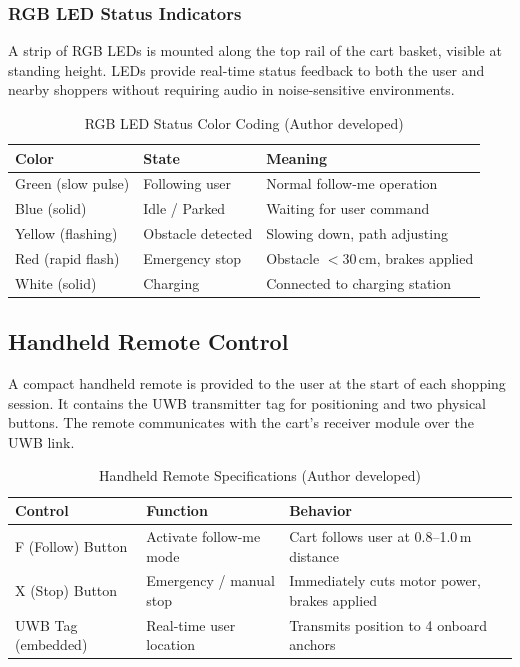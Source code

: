 \subsubsection{RGB LED Status Indicators}

A strip of RGB LEDs is mounted along the top rail of the cart basket,
visible at standing height. LEDs provide real-time status feedback to both
the user and nearby shoppers without requiring audio in noise-sensitive
environments.

\begin{table}[!ht]
\caption{RGB LED Status Color Coding (Author developed)}
\label{tab:led}
\centering
\footnotesize
\begin{tabular}{p{1.8cm} p{1.8cm} p{3.0cm}}
\toprule
\textbf{Color} & \textbf{State} & \textbf{Meaning} \\
\midrule
Green (slow pulse) & Following user & Normal follow-me operation \\
Blue (solid) & Idle / Parked & Waiting for user command \\
Yellow (flashing) & Obstacle detected & Slowing down, path adjusting \\
Red (rapid flash) & Emergency stop & Obstacle $<$30\,cm, brakes applied \\
White (solid) & Charging & Connected to charging station \\
\bottomrule
\end{tabular}
\end{table}

\subsection{Handheld Remote Control}

A compact handheld remote is provided to the user at the start of each
shopping session. It contains the UWB transmitter tag for positioning and
two physical buttons. The remote communicates with the cart's receiver
module over the UWB link.

\begin{table}[!ht]
\caption{Handheld Remote Specifications (Author developed)}
\label{tab:remote}
\centering
\footnotesize
\begin{tabular}{p{1.8cm} p{2.0cm} p{2.8cm}}
\toprule
\textbf{Control} & \textbf{Function} & \textbf{Behavior} \\
\midrule
F (Follow) Button & Activate follow-me mode & Cart follows user at 0.8--1.0\,m distance \\
X (Stop) Button & Emergency / manual stop & Immediately cuts motor power, brakes applied \\
UWB Tag (embedded) & Real-time user location & Transmits position to 4 onboard anchors \\
\bottomrule
\end{tabular}
\end{table}

